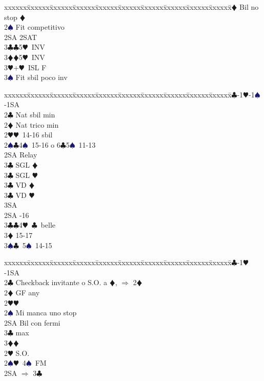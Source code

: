 \documentclass[a4paper,italian]{article}
\newcommand{\BC}{\textcolor{OliveGreen}{$\clubsuit$}}
\newcommand{\BD}{\textcolor{RedOrange}{$\vardiamondsuit$}}
\newcommand{\BH}{\textcolor{Red2}{$\varheartsuit${}}}
\newcommand{\BS}{\textcolor{MidnightBlue}{$\spadesuit${}}}
\newenvironment{bidtable}
{\begin{tabbing}

    xxxxxx\=xxxxxx\=xxxxxx\=xxxxxx\=xxxxxx\=xxxxxx\=xxxxxx\=xxxxxx\=xxxxxx\=xxxxxx\=\kill}
{\end{tabbing} }%
\begin{document}
\begin{multicols}{2}
\begin{bidtable}
        3\BD \> Bil no stop \BD \-\\
        [2pt]2\BS \> Fit competitivo\\
        2SA \> 2SAT\\
        3\BC {}\BC 5\BH\ INV\\
        3\BD {}\BD 5\BH\ INV\\
        3\BH {}+\BH\ ISL F\\
        3\BS \> Fit sbil poco inv\-
    \end{bidtable}
    \vfill\null
    \columnbreak
    \begin{bidtable}
        1\BC-1\BH-1\BS-1SA\+\\
        2\BC \> Nat sbil min\\
        2\BD \> Nat trico min\\
        2\BH {}\BH\ 14-16 sbil\\
        2\BS {}\BC 4\BS\ 15-16 o 6\BC 5\BS\ 11-13\+\\
        2SA \> Relay\+\\
        3\BC {} SGL \BD\\
        3\BC {} SGL \BH\\
        3\BC {} VD \BD\\
        3\BC {} VD \BH\\
        3SA \-\-\\
        2SA -16\\
        3\BC {}\BC 4\BH\ \BC\ belle\\
        3\BD {} 15-17\\
        3\BS {}\BC\ 5\BS\ 14-15\-
    \end{bidtable}
    \bigbreak
    \begin{bidtable}
        1\BC-1\BH-1SA\+\\
        2\BC \> Checkback invitante o S.O. a \BD , $\Rightarrow$ 2\BD \\
        2\BD \> GF any\+\\
        2\BH {}\BH \\
        2\BS \> Mi manca uno stop\\
        2SA \> Bil con fermi\\
        3\BC {} max\\
        3\BD {}\BD \-\\
        [2pt]2\BH \> S.O.\\
        [2pt]2\BS {}\BH\ 4\BS\ FM\\
        2SA \> $\Rightarrow$ 3\BC \+\\

\end{bidtable}
\end{multicols}
\end{document}

